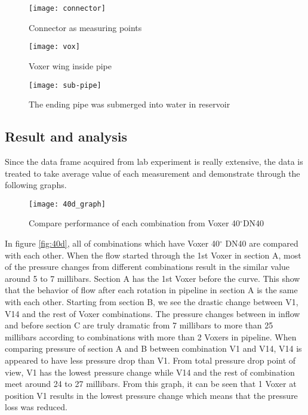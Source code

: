 \begin{figure}[!htb]
   \begin{minipage}{0.48\textwidth}
     \centering
     \texttt{[image: connector]}
     \caption{Connector as measuring points}\label{fig:connector}
   \end{minipage}\hfill
   \begin {minipage}{0.48\textwidth}
     \centering
     \texttt{[image: vox]}
     \caption{Voxer wing inside pipe}\label{fig:vox}
   \end{minipage}
\end{figure}


\begin{figure}[h]
  \centering
  \texttt{[image: sub-pipe]}
  \caption{ The ending pipe was submerged into water in reservoir}
  \label{fig:subpipe}
\end{figure}

\subsection{Result and analysis}

Since the data frame acquired from lab experiment is really extensive, the data is treated to take average value of each measurement and demonstrate through the following graphs.

\begin{figure}[h!]
  \centering
  \texttt{[image: 40d\_graph]}
  \caption{ Compare performance of each combination from Voxer 40$^{\circ}$DN40}
  \label{fig:40d}
\end{figure}

In figure \vref{fig:40d}, all of combinations which have Voxer 40$^{\circ}$ DN40 are compared with each other. When the flow started through the 1st Voxer in section A, most of the pressure changes from different combinations result in the similar value around 5 to 7 millibars. Section A has the 1st Voxer before the curve. This show that the behavior of flow after each rotation in pipeline in section A is the same with each other. Starting from section B, we see the drastic change between V1, V14 and the rest of Voxer combinations. The pressure changes between in inflow and before section C are truly dramatic from 7 millibars to more than 25 millibars according to combinations with more than 2 Voxers in pipeline. When comparing pressure of section A and B between combination V1 and V14, V14 is appeared to have less pressure drop than V1. From total pressure drop point of view, V1 has the lowest pressure change while V14 and the rest of combination meet around 24 to 27 millibars. From this graph, it can be seen that 1 Voxer at position V1 results in the lowest pressure change which means that the pressure loss was reduced. 

